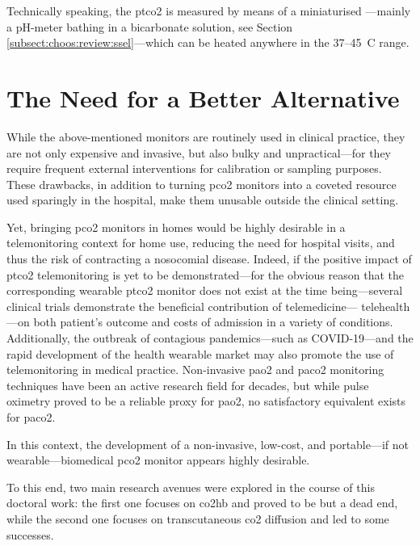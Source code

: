 Technically speaking, the \gls{ptco2} is measured by means of a miniaturised \ssel{}---mainly a pH-meter bathing in a bicarbonate solution, see Section \ref{subsect:choos:review:ssel}---which can be heated anywhere in the 37--45~{\degree}C range\cite{mari2019}.

\section{The Need for a Better Alternative}

While the above-mentioned monitors are routinely used in clinical practice, they are not only expensive and invasive, but also bulky and unpractical---for they require frequent external interventions for calibration or sampling purposes. These drawbacks, in addition to turning \gls{pco2} monitors into a coveted resource used sparingly in the hospital, make them unusable outside the clinical setting.

Yet, bringing \gls{pco2} monitors in homes would be highly desirable in a telemonitoring context for home use, reducing the need for hospital visits, and thus the risk of contracting a nosocomial disease. Indeed, if the positive impact of \gls{ptco2} telemonitoring is yet to be demonstrated---for the obvious reason that the corresponding wearable \gls{ptco2} monitor does not exist at the time being---several clinical trials demonstrate the beneficial contribution of telemedicine---\aka{} telehealth---on both patient's outcome and costs of admission in a variety of conditions\cite{steventon2012, kruse2019, yun2018}. Additionally, the outbreak of contagious pandemics---such as COVID-19\cite{garfan2021}---and the rapid development of the health wearable market\cite{dunn2018, yetisen2018, chung2019, dagher2020} may also promote the use of telemonitoring in medical practice. Non-invasive \gls{pao2} and \gls{paco2} monitoring techniques have been an active research field for decades\cite{severinghaus1986_3, severinghaus1986_6, huttmann2014}, but while pulse oximetry proved to be a reliable proxy for \gls{pao2}\cite{nitzan2014, jubran2015}, no satisfactory equivalent exists for \gls{paco2}.

\begin{keypointbox}
	In this context, the development of a non-invasive, low-cost, and portable---if not wearable---biomedical \gls{pco2} monitor appears highly desirable.
\end{keypointbox}

To this end, two main research avenues were explored in the course of this doctoral work: the first one focuses on \gls{co2hb} and proved to be but a dead end, while the second one focuses on transcutaneous \gls{co2} diffusion and led to some successes.

